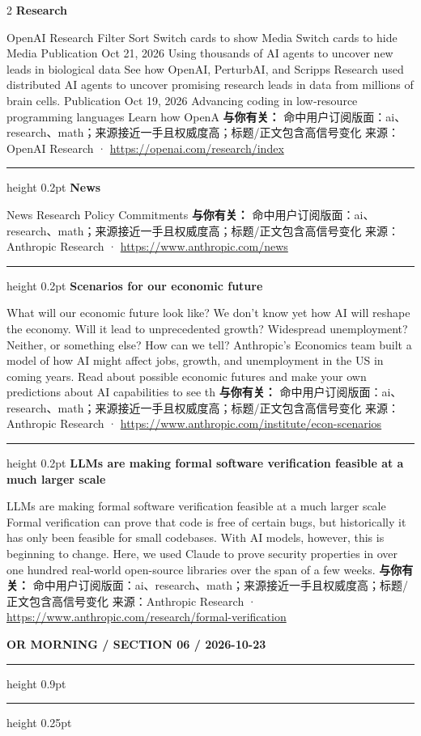 \documentclass[10.5pt]{ctexart}
\begin{document}
\begin{multicols}{2}
{\large\bfseries Research}\par
OpenAI Research Filter Sort Switch cards to show Media Switch cards to hide Media Publication Oct 21, 2026 Using thousands of AI agents to uncover new leads in biological data See how OpenAI, PerturbAI, and Scripps Research used distributed AI agents to uncover promising research leads in data from millions of brain cells. Publication Oct 19, 2026 Advancing coding in low‑resource programming languages Learn how OpenA
\textbf{与你有关：} 命中用户订阅版面：ai、research、math；来源接近一手且权威度高；标题/正文包含高信号变化
{\footnotesize\color{ormuted} 来源：OpenAI Research · \url{https://openai.com/research/index}}
\vspace{2mm}
\hrule height 0.2pt
\vspace{2mm}
{\large\bfseries News}\par
News Research Policy Commitments
\textbf{与你有关：} 命中用户订阅版面：ai、research、math；来源接近一手且权威度高；标题/正文包含高信号变化
{\footnotesize\color{ormuted} 来源：Anthropic Research · \url{https://www.anthropic.com/news}}
\vspace{2mm}
\hrule height 0.2pt
\vspace{2mm}
{\large\bfseries Scenarios for our economic future}\par
What will our economic future look like? We don’t know yet how AI will reshape the economy. Will it lead to unprecedented growth? Widespread unemployment? Neither, or something else? How can we tell? Anthropic’s Economics team built a model of how AI might affect jobs, growth, and unemployment in the US in coming years. Read about possible economic futures and make your own predictions about AI capabilities to see th
\textbf{与你有关：} 命中用户订阅版面：ai、research、math；来源接近一手且权威度高；标题/正文包含高信号变化
{\footnotesize\color{ormuted} 来源：Anthropic Research · \url{https://www.anthropic.com/institute/econ-scenarios}}
\vspace{2mm}
\hrule height 0.2pt
\vspace{2mm}
{\large\bfseries LLMs are making formal software verification feasible at a much larger scale}\par
LLMs are making formal software verification feasible at a much larger scale Formal verification can prove that code is free of certain bugs, but historically it has only been feasible for small codebases. With AI models, however, this is beginning to change. Here, we used Claude to prove security properties in over one hundred real-world open-source libraries over the span of a few weeks.
\textbf{与你有关：} 命中用户订阅版面：ai、research、math；来源接近一手且权威度高；标题/正文包含高信号变化
{\footnotesize\color{ormuted} 来源：Anthropic Research · \url{https://www.anthropic.com/research/formal-verification}}
\end{multicols}
\newpage
{\small\bfseries OR MORNING / SECTION 06 / 2026-10-23}
\vspace{2mm}
\hrule height 0.9pt
\vspace{1.5mm}
\hrule height 0.25pt
\vspace{4mm}
\end{document}
